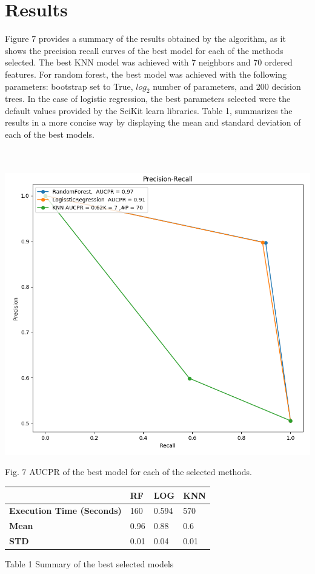 \documentclass{article}
\begin{document}
\section{Results}
Figure 7 provides a summary of the results obtained by the algorithm, as it shows the precision recall curves of the best model for each of the methods selected. The best KNN model was achieved with 7 neighbors and 70 ordered features. For random forest, the best model was achieved with the following parameters: bootstrap set to True, $log_2$ number of parameters, and 200 decision trees. In the case of logistic regression, the best parameters selected were the default values provided by the SciKit learn libraries. Table 1, summarizes the results in a more concise way by displaying the mean and standard deviation of each of the best models. 
\\
\\
\\

\begin{center}
\includegraphics[scale=.25]{ALLModels.png} %
\end{center}
Fig. 7 AUCPR of the best model for each of the selected methods. 

\begin{table}[H]
\begin{tabular}{|l|l|l|l|}
\hline
                        & \textbf{RF} & \textbf{LOG} & \textbf{KNN} \\ \hline
\textbf{Execution Time (Seconds)} & 160         & 0.594        & 570          \\ \hline
\textbf{Mean}           & 0.96        & 0.88         & 0.6          \\ \hline
\textbf{STD}            & 0.01        & 0.04         & 0.01         \\ \hline
\end{tabular}
\end{table}
Table 1  Summary of the best selected models 
\end{document}
